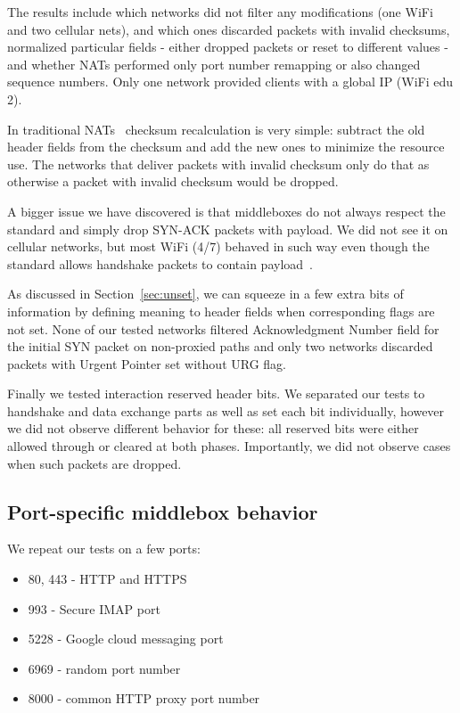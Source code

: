 \documentclass{sig-alternate-10pt}
\begin{document}
The results include which networks did not filter any modifications (one WiFi and two cellular nets), and which ones discarded packets with invalid checksums, normalized particular fields - either dropped packets or reset to different values - and whether NATs performed only port number remapping or also changed sequence numbers. Only one network provided clients with a global IP (WiFi edu 2).

In traditional NATs~\cite{Egevang:tu} checksum recalculation is very simple: subtract the old header fields from the checksum and add the new ones to minimize the resource use. The networks that deliver packets with invalid checksum only do that as otherwise a packet with invalid checksum would be dropped.

A bigger issue we have discovered is that middleboxes do not always respect the standard and simply drop SYN-ACK packets with payload. We did not see it on cellular networks, but most WiFi (4/7) behaved in such way even though the standard allows handshake packets to contain payload~\cite{Postel:3EDyoxP_,Chu:2011tn}.


As discussed in Section~\ref{sec:unset}, we can squeeze in a few extra bits of information by defining meaning to header fields when corresponding flags are not set. None of our tested networks filtered Acknowledgment Number field for the initial SYN packet on non-proxied paths and only two networks discarded packets with Urgent Pointer set without URG flag.

Finally we tested interaction reserved header bits. We separated our tests to handshake and data exchange parts as well as set each bit individually, however we did not observe different behavior for these: all reserved bits were either allowed through or cleared at both phases. Importantly, we did not observe cases when such packets are dropped.


\subsection{Port-specific middlebox behavior}
\label{sec:portspec}

We repeat our tests on a few ports:
\begin{itemize}
    \item 80, 443 - HTTP and HTTPS
    \item 993 - Secure IMAP port
    \item 5228 - Google cloud messaging port
    \item 6969 - random port number
    \item 8000 - common HTTP proxy port number
\end{itemize}
\end{document}
